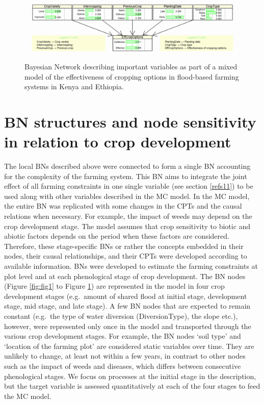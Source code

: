 \documentclass[]{elsarticle} %
\begin{document}
\begin{figure}[!h]

{\centering \includegraphics[width=1\linewidth,]{figures/figure_s6} 

}

\caption{Bayesian Network describing important variables as part of a mixed model of the effectiveness of cropping options in flood-based farming systems in Kenya and Ethiopia.}\label{fig:fig6}
\end{figure}

\hypertarget{refs2}{%
\section{BN structures and node sensitivity in relation to crop development}\label{refs2}}

The local BNs described above were connected to form a single BN accounting for the complexity of the farming system. This BN aims to integrate the joint effect of all farming constraints in one single variable (see section \ref{refs11}) to be used along with other variables described in the MC model. In the MC model, the entire BN was replicated with some changes in the CPTs and the causal relations when necessary. For example, the impact of weeds may depend on the crop development stage. The model assumes that crop sensitivity to biotic and abiotic factors depends on the period when these factors are considered. Therefore, these stage-specific BNs or rather the concepts embedded in their nodes, their causal relationships, and their CPTs were developed according to available information. BNs were developed to estimate the farming constraints at plot level and at each phenological stage of crop development. The BN nodes (Figure \ref{fig:fig1} to Figure \ref{fig:fig6}) are represented in the model in four crop development stages (e.g.~amount of shared flood at initial stage, development stage, mid stage, and late stage). A few BN nodes that are expected to remain constant (e.g.~the type of water diversion (DiversionType), the slope etc.), however, were represented only once in the model and transported through the various crop development stages. For example, the BN nodes `soil type' and `location of the farming plot' are considered static variables over time. They are unlikely to change, at least not within a few years, in contrast to other nodes such as the impact of weeds and diseases, which differs between consecutive phenological stages. We focus on processes at the initial stage in the description, but the target variable is assessed quantitatively at each of the four stages to feed the MC model.
\end{document}
